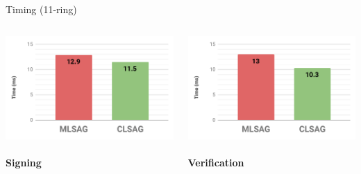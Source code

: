 \documentclass[aspectratio=169]{beamer}
\begin{document}
\begin{frame}{Timing (11-ring)}
\begin{columns}
\begin{column}{0.5\textwidth}
\centering
\includegraphics[width=\textwidth]{sig-sign.pdf} \\~\\
\textbf{Signing}
\end{column}
\begin{column}{0.5\textwidth}
\centering
\includegraphics[width=\textwidth]{sig-verify.pdf} \\~\\
\textbf{Verification}
\end{column}
\end{columns}
\end{frame}
\end{document}
